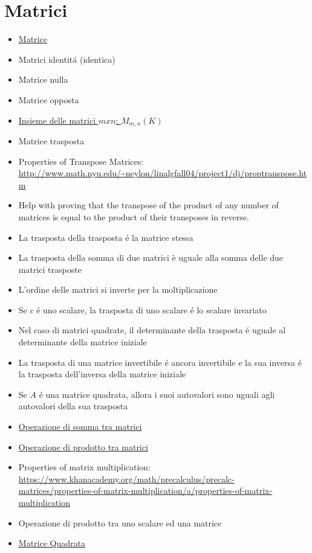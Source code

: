 \documentclass[a4paper,10pt]{article}
\begin{document}
\section{Matrici}
\begin{itemize}
   \item \href{Matrice.html}{Matrice}
   \item Matrici identit\'{a} (identica)
   \item Matrice nulla
   \item Matrice opposta 
   \item \href{InsiemeDelleMatrici.html}{Insieme delle matrici $mxn$: $M_{m,n}(K)$}
   \item Matrice trasposta
   \item Properties of Transpose Matrices: \url{http://www.math.nyu.edu/~neylon/linalgfall04/project1/dj/proptranspose.htm}
   \item Help with proving that the transpose of the product of any number of matrices is equal to the product of their transposes in reverse.
   \item La trasposta della trasposta \'{e} la matrice stessa
   \item La trasposta della somma di due matrici è uguale alla somma delle due matrici trasposte
   \item L'ordine delle matrici si inverte per la moltiplicazione
   \item Se $c$ \'{e} uno scalare, la trasposta di uno scalare \'{e} lo scalare invariato
   \item Nel caso di matrici quadrate, il determinante della trasposta \'{e} uguale al determinante della matrice iniziale
   \item La trasposta di una matrice invertibile \'{e} ancora invertibile e la sua inversa \'{e} la trasposta dell'inversa della matrice iniziale
   \item Se $A$ \'{e} una matrice quadrata, allora i suoi autovalori sono uguali agli autovalori della sua trasposta
   \item \href{SommaMatrici.html}{Operazione di somma tra matrici}
   \item \href{ProdottoMatrici.html}{Operazione di prodotto tra matrici}
   \item Properties of matrix multiplication: \url{https://www.khanacademy.org/math/precalculus/precalc-matrices/properties-of-matrix-multiplication/a/properties-of-matrix-multiplication}
   \item Operazione di prodotto tra uno scalare ed una matrice
   \item \href{MatriceQuadrata.html}{Matrice Quadrata}

\end{itemize}
\end{document}
